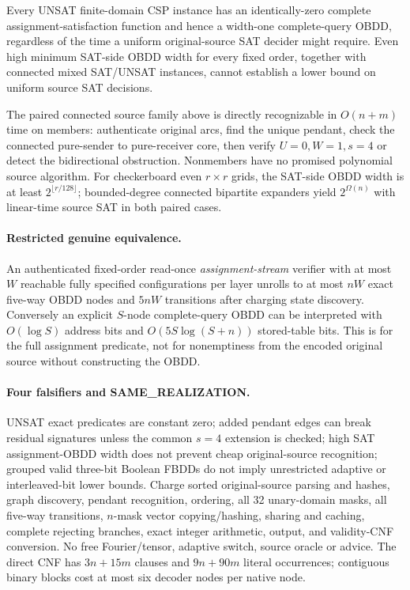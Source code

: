 \documentclass[11pt]{article}
\begin{document}
\begin{corollary}
Every UNSAT finite-domain CSP instance has an identically-zero complete
assignment-satisfaction function and hence a width-one complete-query
OBDD, regardless of the time a uniform original-source SAT decider
might require. Even high minimum SAT-side OBDD width for every fixed
order, together with connected mixed SAT/UNSAT instances, cannot
establish a lower bound on uniform source SAT decisions.
\end{corollary}
The paired connected source family above is directly recognizable in
$O(n+m)$ time on members: authenticate original arcs, find the unique
pendant, check the connected pure-sender to pure-receiver core, then
verify $U=0,W=1,s=4$ or detect the bidirectional obstruction.
Nonmembers have no promised polynomial source algorithm.
For checkerboard even $r\times r$ grids, the SAT-side OBDD width
is at least $2^{\lfloor r/128\rfloor}$; bounded-degree connected
bipartite expanders yield $2^{\Omega(n)}$ with linear-time source SAT
in both paired cases.
\paragraph{Restricted genuine equivalence.}
An authenticated fixed-order read-once \emph{assignment-stream}
verifier with at most $W$ reachable fully specified configurations
per layer unrolls to at most $nW$ exact five-way OBDD nodes and
$5nW$ transitions after charging state discovery.
Conversely an explicit $S$-node complete-query OBDD can be interpreted
with $O(\log S)$ address bits and $O(5S\log(S+n))$ stored-table bits.
This is for the full assignment predicate, not for nonemptiness from
the encoded original source without constructing the OBDD.
\paragraph{Four falsifiers and SAME\_REALIZATION.}
UNSAT exact predicates are constant zero; added pendant edges can
break residual signatures unless the common $s=4$ extension is checked;
high SAT assignment-OBDD width does not prevent cheap original-source
recognition; grouped valid three-bit Boolean FBDDs do not imply
unrestricted adaptive or interleaved-bit lower bounds.
Charge sorted original-source parsing and hashes, graph discovery,
pendant recognition, ordering, all 32 unary-domain masks, all five-way
transitions, $n$-mask vector copying/hashing, sharing and caching,
complete rejecting branches, exact integer arithmetic, output,
and validity-CNF conversion. No free Fourier/tensor, adaptive switch,
source oracle or advice. The direct CNF has $3n+15m$ clauses and
$9n+90m$ literal occurrences; contiguous binary blocks cost at most
six decoder nodes per native node.
\end{document}
